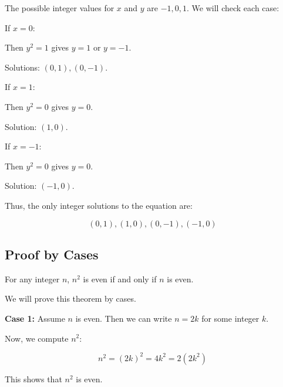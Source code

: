 The possible integer values for \(x\) and \(y\) are \( -1, 0, 1 \). We will check each case:
\vspace{\baselineskip}

If \( x = 0 \):
\vspace{\baselineskip}

Then \( y^2 = 1 \) gives \( y = 1 \) or \( y = -1 \).
\vspace{\baselineskip}

Solutions: \( (0, 1), (0, -1) \).
\vspace{\baselineskip}

If \( x = 1 \):
\vspace{\baselineskip}

Then \( y^2 = 0 \) gives \( y = 0 \).
\vspace{\baselineskip}

Solution: \( (1, 0) \).
\vspace{\baselineskip}

If \( x = -1 \):
\vspace{\baselineskip}

Then \( y^2 = 0 \) gives \( y = 0 \).
\vspace{\baselineskip}

Solution: \( (-1, 0) \).
\vspace{\baselineskip}

Thus, the only integer solutions to the equation are:
	
\[
	(0, 1), (1, 0), (0, -1), (-1, 0)
\]

\QED

\subsection{Proof by Cases}

For any integer \(n\), \( n^2 \) is even if and only if \(n\) is even.
\vspace{\baselineskip}

We will prove this theorem by cases.
\vspace{\baselineskip}

\textbf{Case 1:} Assume \(n\) is even. Then we can write \( n = 2k \) for some integer \(k\).
\vspace{\baselineskip}

Now, we compute \( n^2 \):

\[
	n^2 = {(2k)}^2 = 4k^2 = 2(2k^2)
\]

This shows that \( n^2 \) is even.
\vspace{\baselineskip}

